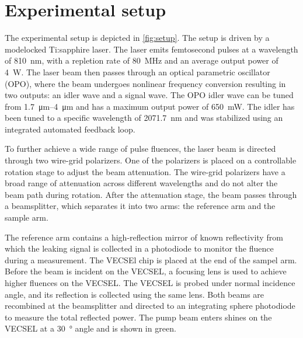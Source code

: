 \section{Experimental setup}\label{sec:setup}

The experimental setup is depicted in \cref{fig:setup}. The setup is driven by a modelocked Ti:sapphire laser. The laser emits femtosecond pulses at a wavelength of \qty{810}{\nm}, with a repletion rate of \qty{80}{\MHz} and an average output power of \qty{4}{\W}. The laser beam then passes through an optical parametric oscillator (OPO), where the beam undergoes nonlinear frequency conversion resulting in two outputs: an idler wave and a signal wave. The OPO idler wave can be tuned from \qtyrange{1.7}{4}{\um} and has a maximum output power of \qty{650}{\mW}. The idler has been tuned to a specific wavelength of \qty{2071.7}{\nm} and was stabilized using an integrated automated feedback loop.

To further achieve a wide range of pulse fluences, the laser beam is directed through two wire-grid polarizers. One of the polarizers is placed on a controllable rotation stage to adjust the beam attenuation. The wire-grid polarizers have a broad range of attenuation across different wavelengths and do not alter the beam path during rotation. After the attenuation stage, the beam passes through a beamsplitter, which separates it into two arms: the reference arm and the sample arm. 

The reference arm contains a high-reflection mirror of known reflectivity from which the leaking signal is collected in a photodiode to monitor the fluence during a measurement. 
The VECSEl chip is placed at the end of the sampel arm. Before the beam is incident on the VECSEL, a focusing lens is used to achieve higher fluences on the VECSEL. The VECSEL is probed under normal incidence angle, and its reflection is collected using the same lens. Both beams are recombined at the beamsplitter and directed to an integrating sphere photodiode to measure the total reflected power. The pump beam enters shines on the VECSEL at a \qty{30}{\degree} angle and is shown in green. 

